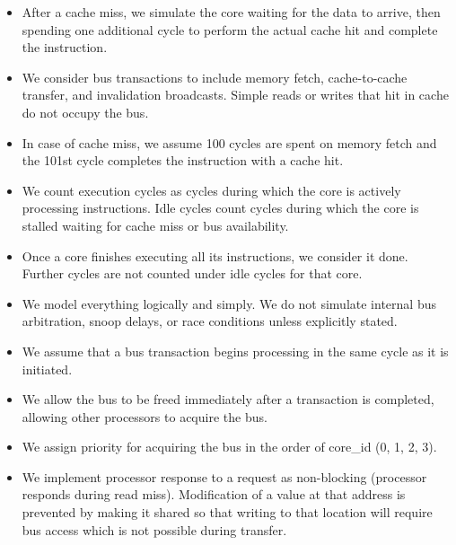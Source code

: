 \documentclass[11pt,a4paper]{article}
\begin{document}
\begin{itemize}[leftmargin=*]
\begin{itemize}[leftmargin=*]
        \item After a cache miss, we simulate the core waiting for the data to arrive, then spending
        one additional cycle to perform the actual cache hit and complete the
        instruction.
        
        \item We consider bus transactions to include memory fetch, cache-to-cache transfer, and invalidation
        broadcasts. Simple reads or writes that hit in cache do not occupy
        the bus.
        
        \item In case of cache miss, we assume 100 cycles are spent on memory fetch and
        the 101st cycle completes the instruction with a cache hit.
        
        \item We count execution cycles as cycles during which the core is actively processing
        instructions. Idle cycles count cycles during which the core is stalled
        waiting for cache miss or bus availability.
        
        \item Once a core finishes executing all its instructions, we consider it done.
        Further cycles are not counted under idle cycles for that core.
        
        \item We model everything logically and simply. We do not simulate internal
        bus arbitration, snoop delays, or race conditions unless explicitly
        stated.
        
        \item We assume that a bus transaction begins processing in the same cycle as it is initiated.
        
        \item We allow the bus to be freed immediately after a transaction is completed, allowing other processors to acquire the bus.
        
        \item We assign priority for acquiring the bus in the order of core\_id (0, 1, 2, 3).
        
        \item We implement processor response to a request as non-blocking (processor responds during read miss). Modification of a value at that address is prevented by making it shared so that writing to that location will require bus access which is not possible during transfer.
    \end{itemize}


\end{itemize}
\end{document}

